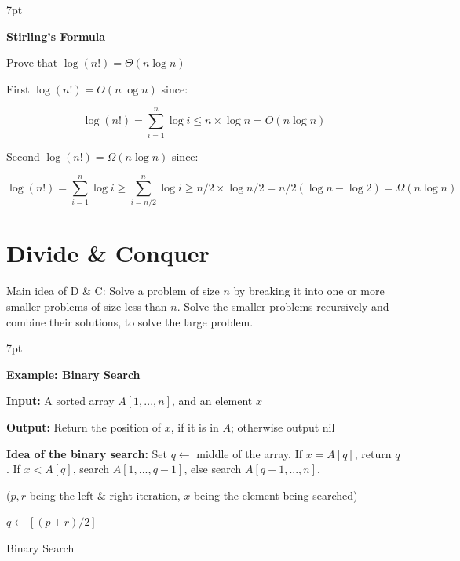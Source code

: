\documentclass[10pt]{article}
\newenvironment{formal}[2]{%
	\def\FrameCommand{%
		\hspace{1pt}%
		{\color{#1}\vrule width 2pt}%
		{\color{#2}\vrule width 4pt}%
		\colorbox{#2}%
	}%
	\MakeFramed{\advance\hsize-\width\FrameRestore}%
	\noindent\hspace{-4.55pt}%
	\begin{adjustwidth}{}{7pt}%
		\vspace{2pt}\vspace{2pt}%
	}
	{%
		\vspace{2pt}\end{adjustwidth}\endMakeFramed%
}
\begin{document}
\begin{formal}{DarkGreen}{greenshade}

	\textbf{Stirling's Formula}
	
	Prove that $\log (n!) = \Theta (n \log n)$
	
	First $\log (n!) = O (n \log n)$ since:
	
	$$
	\log (n!) = \sum_{i=1}^n \log i \leq n \times \log n = O (n \log n)
	$$

	Second $\log (n!) = \Omega (n \log n)$ since:
	
	$$
	\log (n!) = \sum_{i=1}^n \log i \geq \sum_{i=n/2}^n \log i \geq n/2 \times \log n/2 = n/2 (\log n - \log 2) = \Omega (n \log n)
	$$

\end{formal}

\section{Divide \& Conquer}

Main idea of D \& C: Solve a problem of size $n$ by breaking it into one or more smaller problems of size less than $n$. Solve the smaller problems recursively and combine their solutions, to solve the large problem.

\begin{formal}{Brown}{brownshade}
	
	\textbf{Example: Binary Search}
	
	\textbf{Input:} A sorted array $A[1,...,n]$, and an element $x$
	
	\textbf{Output:} Return the position of $x$, if it is in $A$; otherwise output nil
	
	\textbf{Idea of the binary search:} Set $q \gets$ middle of the array. If $x = A[q]$, return $q$. If $x < A[q]$, search $A[1,...,q-1]$, else search $A[q+1,...,n]$.
	
\end{formal}

\begin{algorithm}
	\SetAlgoLined
	($p, r$ being the left \& right iteration, $x$ being the element being searched){
		$q \gets [(p+r)/2]$
		
	}
	\caption{Binary Search}
\end{algorithm}
\end{document}
